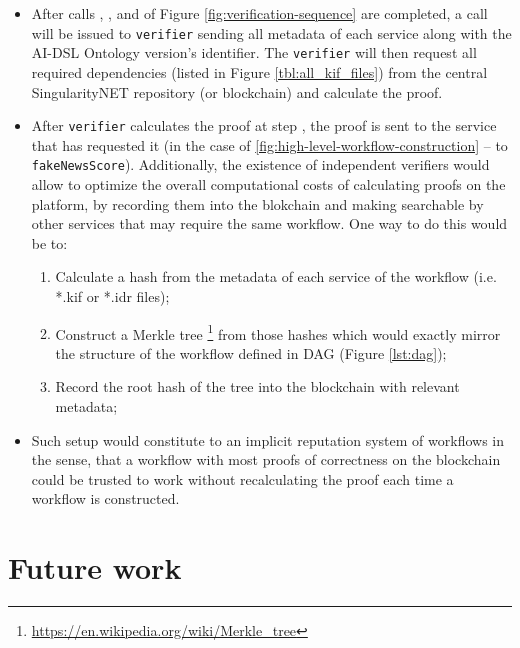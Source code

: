 \documentclass[]{report}
\begin{document}
\begin{enumerate}
\begin{itemize}
	\item After calls , ,  and  of 
	Figure \ref{fig:verification-sequence} are completed, a call  will be issued to
	 \texttt{verifier} sending all metadata of each  service along
	 with the AI-DSL Ontology version's identifier. The \texttt{verifier} will then 
	 request all required dependencies
	 (listed in Figure \ref{tbl:all_kif_files}) from the central SingularityNET repository 
	 (or blockchain) and calculate the proof.	 
	\item After \texttt{verifier} calculates the proof at step , 
	the proof is sent to the service that has requested it (in the case of
	\ref{fig:high-level-workflow-construction} -- to \texttt{fakeNewsScore}). 
	Additionally, the existence of independent verifiers would allow to optimize the overall computational 
	costs of calculating proofs on the platform, by recording them into the blokchain and making
	 searchable by other services that may require the same workflow. One way to do this would be to:
	\begin{enumerate}
		\item Calculate a hash from the metadata of each service of the workflow 
		(i.e. *.kif or *.idr files);
		\item Construct a Merkle tree
		\footnote{\href{https://en.wikipedia.org/wiki/Merkle_tree}{https://en.wikipedia.org/wiki/Merkle\_tree}} 
		from those hashes which would exactly mirror the structure of the workflow 
		defined in DAG (Figure \ref{lst:dag});
		\item Record the root hash of the tree into the blockchain with relevant metadata;
	\end{enumerate}

	 \item Such setup would constitute to an implicit reputation system of workflows in the sense, that 
	 a workflow with most proofs of correctness on the blockchain could be trusted to work without 
	 recalculating the proof each time a workflow is constructed. 
	
\end{itemize}

\end{enumerate}

\section{Future work}
\end{document}
